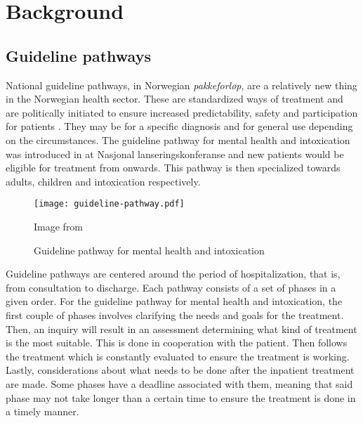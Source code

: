 \chapter{Background}
\label{ch:background}



\section{Guideline pathways}
\label{sec:pathways}

National guideline pathways, in Norwegian \emph{pakkeforløp}, are a relatively new thing in the Norwegian health sector. These are standardized ways of treatment and are politically initiated to ensure increased predictability, safety and participation for patients \autocite{helsedirektoratet2019}. They may be for a specific diagnosis and for general use depending on the circumstances. The guideline pathway for mental health and intoxication was introduced in  at Nasjonal lanseringskonferanse \autocite{haugland2018} and new patients would be eligible for treatment from  onwards. This pathway is then specialized towards adults, children and intoxication respectively. %

\begin{figure}
    \centering
    \texttt{[image: guideline-pathway.pdf]}
    \caption{Guideline pathway for mental health and intoxication}
    Image from \textcite{haugland2018}
    \label{fig:guideline-pathway}
\end{figure}

Guideline pathways are centered around the period of hospitalization, that is, from consultation to discharge. Each pathway consists of a set of phases in a given order. For the guideline pathway for mental health and intoxication, the first couple of phases involves clarifying the needs and goals for the treatment. Then, an inquiry will result in an assessment determining what kind of treatment is the most suitable. This is done in cooperation with the patient. Then follows the treatment which is constantly evaluated to ensure the treatment is working. Lastly, considerations about what needs to be done after the inpatient treatment are made. Some phases have a deadline associated with them, meaning that said phase may not take longer than a certain time to ensure the treatment is done in a timely manner.

